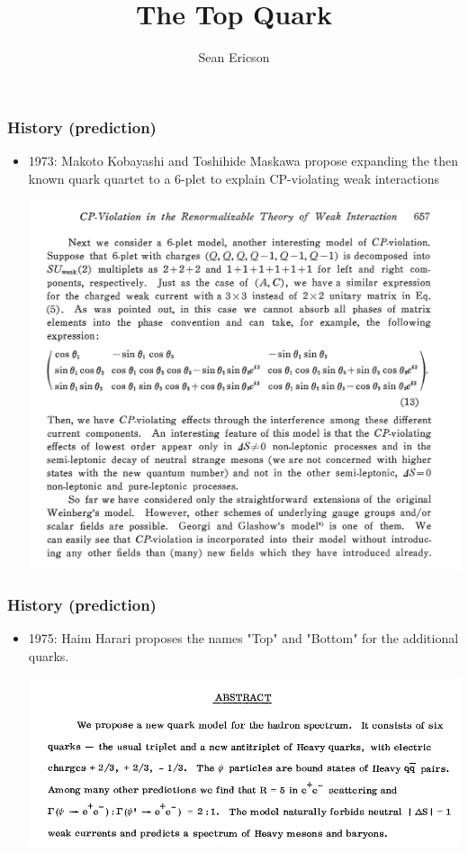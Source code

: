 \documentclass{beamer}
\title{The Top Quark}
\author{Sean Ericson}
\institute{UO}
\date{}
\begin{document}
\frame{\titlepage}

\begin{frame}
\frametitle{History (prediction)}
\begin{itemize}
    \item<1-> 1973: Makoto Kobayashi and Toshihide Maskawa propose expanding the then known quark quartet to a 6-plet to explain CP-violating weak interactions
    \begin{center}
        \includegraphics[scale=0.3]{images/6plet.PNG}
    \end{center}
\end{itemize}
\end{frame}

\begin{frame}
\frametitle{History (prediction)}
    \begin{itemize}
        \item<1-> 1975: Haim Harari proposes the names "Top" and "Bottom" for the additional quarks.
        \begin{center}
            \includegraphics[scale=0.6]{images/harari.PNG}
        \end{center}
    \end{itemize}
\end{frame}
\end{document}
